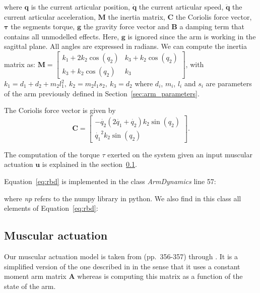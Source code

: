 \documentclass[pdftex,a4paper,11pt]{report}
\begin{document}
where $\textbf{q}$ is the current articular position, $\boldsymbol{\dot{q}}$ the current articular speed, $\boldsymbol{\ddot{q}}$ the current articular acceleration, $\textbf{M}$ the inertia matrix, $\textbf{C}$ the Coriolis force vector, $\boldsymbol{\tau}$ the segments torque, $\textbf{g}$ the gravity force vector and $\textbf{B}$ a damping term that contains all unmodelled effects.
Here, $\textbf{g}$ is ignored since the arm is working in the sagittal plane.
All angles are expressed in radians.
We can compute the inertia matrix as:
$
\textbf{M} = \begin{bmatrix}
           k_1 + 2 k_2 \cos(q_2)   &  k_3 + k_2 \cos(q_2) \\%
           k_3 + k_2 \cos(q_2)     &  k_3
          \end{bmatrix}
$, with $k_1 = d_1 + d_2 + m_2 l_1^2, ~ k_2 = m_2 l_1 s_2, ~ k_3 = d_2$ where $d_i$, $m_i$, $l_i$ and $s_i$ are parameters of the arm previously defined in Section~\ref{sec:arm_parameters}.

The Coriolis force vector is given by
$$
\textbf{C} = \begin{bmatrix}
           - \dot{q_2} (2 \dot{q_1} + \dot{q_2}) k_2 \sin(q_2)\\
            \dot{q_1}^2 k_2 \sin(q_2)
          \end{bmatrix}.
$$

The computation of the torque $\tau$ exerted on the system given an input muscular actuation $\textbf{u}$ is explained in the section~\ref{sec:muscular_actuation}.

Equation~\ref{eq:rbd} is implemented in the class \textit{ArmDynamics} line 57:

where \textit{np} refers to the numpy library in python.
We also find in this class all elements of Equation~\ref{eq:rbd}:


\subsection{Muscular actuation}
\label{sec:muscular_actuation}
Our muscular actuation model is taken from \cite{katayama93} (pp.~356-357) through \cite{mitrovic08_SAB}.
It is a simplified version of the one described in \cite{li2006} in the sense that it uses
a constant moment arm matrix $\textbf{A}$ whereas \cite{li2006} is computing this matrix as
a function of the state of the arm.
\end{document}
